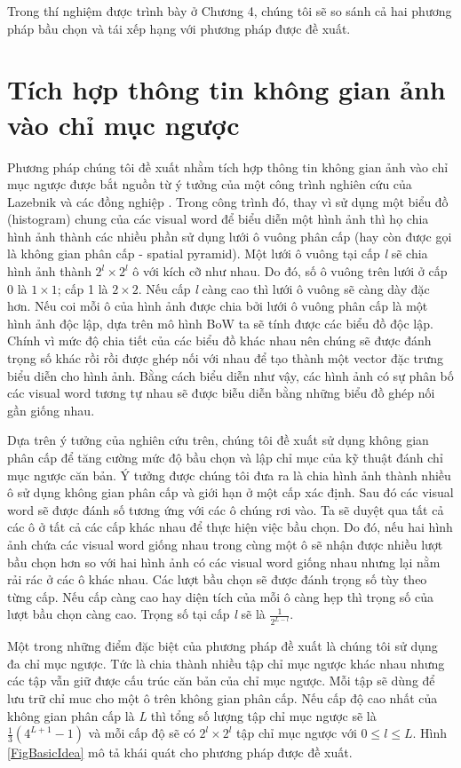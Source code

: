 Trong thí nghiệm được trình bày ở Chương 4, chúng tôi sẽ so sánh cả hai phương pháp bầu chọn và tái xếp hạng với phương pháp được đề xuất.\\

\section{Tích hợp thông tin không gian ảnh vào chỉ mục ngược}
\label{sec:intergrated}
Phương pháp chúng tôi đề xuất nhằm tích hợp thông tin không gian ảnh vào chỉ mục ngược được bắt nguồn từ ý tưởng của một công trình nghiên cứu của Lazebnik và các đồng nghiệp \cite{lazebnik2006beyond}. Trong công trình đó, thay vì sử dụng một biểu đồ (histogram) chung  của các visual word để biểu diễn một hình ảnh thì họ chia hình ảnh thành các nhiều phần sử dụng lưới ô vuông phân cấp (hay còn được gọi là không gian phân cấp - spatial pyramid). Một lưới ô vuông tại cấp \textit{l} sẽ chia hình ảnh thành $2^l \times 2^l$ ô với kích cỡ như nhau. Do đó, số ô vuông trên lưới ở cấp 0 là $1 \times 1$; cấp 1 là $2 \times 2$. Nếu cấp \textit{l} càng cao thì lưới ô vuông sẽ càng dày đặc hơn. Nếu coi mỗi ô của hình ảnh được chia bởi lưới ô vuông phân cấp là một hình ảnh độc lập, dựa trên mô hình BoW ta sẽ tính được các biểu đồ độc lập. Chính vì mức độ chia tiết của các biểu đồ khác nhau nên chúng sẽ được đánh trọng số khác rồi rồi được ghép nối với nhau để tạo thành một vector đặc trưng biểu diễn cho hình ảnh. Bằng cách biểu diễn như vậy, các hình ảnh có sự phân bố các visual word tương tự nhau sẽ được biễu diễn bằng những biểu đồ ghép nối gần giống nhau.

Dựa trên ý tưởng của nghiên cứu trên, chúng tôi đề xuất sử dụng không gian phân cấp để tăng cường mức độ bầu chọn và lập chỉ mục của kỹ thuật đánh chỉ mục ngược căn bản. Ý tưởng được chúng tôi đưa ra là chia hình ảnh thành nhiều ô sử dụng không gian phân cấp và giới hạn ở một cấp xác định. Sau đó các visual word sẽ được đánh số tương ứng với các ô chúng rơi vào. Ta sẽ duyệt qua tất cả các ô ở tất cả các cấp khác nhau để thực hiện việc bầu chọn. Do đó, nếu hai hình ảnh chứa các visual word giống nhau trong cùng một ô sẽ nhận được nhiều lượt bầu chọn hơn so với hai hình ảnh có các visual word giống nhau nhưng lại nằm rải rác ở các ô khác nhau. Các lượt bầu chọn sẽ được đánh trọng số tùy theo từng cấp. Nếu cấp càng cao hay diện tích của mỗi ô càng hẹp thì trọng số của lượt bầu chọn càng cao. Trọng số tại cấp \textit{l} sẽ là $\frac{1}{2^{L-l}}$.

Một trong những điểm đặc biệt của phương pháp đề xuất là chúng tôi sử dụng đa chỉ mục ngược. Tức là chia thành nhiều tập chỉ mục ngược khác nhau nhưng các tập vẫn giữ được cấu trúc căn bản của chỉ mục ngược. Mỗi tập sẽ dùng để lưu trữ chỉ muc cho một ô trên không gian phân cấp. Nếu cấp độ cao nhất của không gian phân cấp là \textit{L} thì tổng số lượng tập chỉ mục ngược sẽ là $\frac{1}{3}(4^{L+1} - 1)$ và mỗi cấp độ sẽ có $2^l \times 2^l$ tập chỉ mục ngược với $0 \leq l \leq L$. Hình \ref{FigBasicIdea} mô tả khái quát cho phương pháp được đề xuất.

